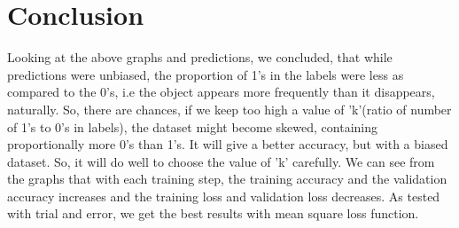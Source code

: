\documentclass[journal]{IEEEtran}
\begin{document}
\section{Conclusion}
Looking at the above graphs and predictions, we concluded, that while predictions were unbiased, the proportion of 1's in the labels were less as compared to the 0's, i.e the object appears more frequently than it disappears, naturally. So, there are chances, if we keep too high a value of 'k'(ratio of number of 1's to 0's in labels), the dataset might become skewed, containing proportionally more 0's than 1's. It will give a better accuracy, but with a biased dataset. So, it will do well to choose the value of 'k' carefully. We can see from the graphs that with each training step, the training accuracy and the validation accuracy increases and the training loss and validation loss decreases. As tested with trial and error, we get the best results with mean square loss function.
\end{document}
